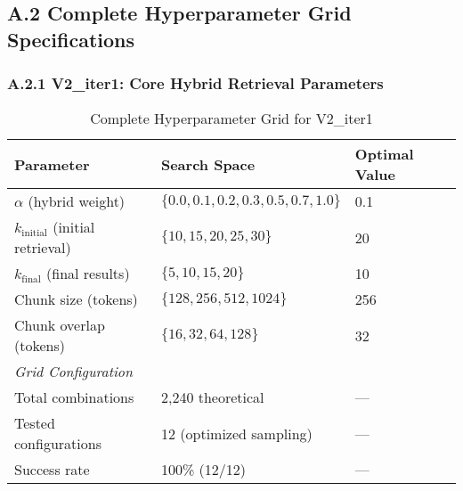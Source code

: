 \documentclass{article}
\begin{document}
\subsection{A.2 Complete Hyperparameter Grid Specifications}

\subsubsection{A.2.1 V2\_iter1: Core Hybrid Retrieval Parameters}
\begin{table}[h]
\centering
\caption{Complete Hyperparameter Grid for V2\_iter1}
\begin{tabular}{@{}lll@{}}
\toprule
\textbf{Parameter} & \textbf{Search Space} & \textbf{Optimal Value} \\
\midrule
$\alpha$ (hybrid weight) & $\{0.0, 0.1, 0.2, 0.3, 0.5, 0.7, 1.0\}$ & 0.1 \\
$k_{\text{initial}}$ (initial retrieval) & $\{10, 15, 20, 25, 30\}$ & 20 \\
$k_{\text{final}}$ (final results) & $\{5, 10, 15, 20\}$ & 10 \\
Chunk size (tokens) & $\{128, 256, 512, 1024\}$ & 256 \\
Chunk overlap (tokens) & $\{16, 32, 64, 128\}$ & 32 \\
\midrule
\multicolumn{3}{l}{\textit{Grid Configuration}} \\
Total combinations & 2,240 theoretical & --- \\
Tested configurations & 12 (optimized sampling) & --- \\
Success rate & 100\% (12/12) & --- \\
\bottomrule
\end{tabular}
\end{table}
\end{document}
